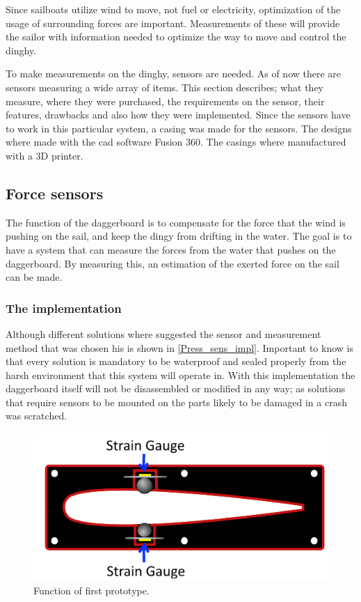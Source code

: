 
Since sailboats utilize wind to move, not fuel or electricity, optimization of the usage of surrounding forces are important. Measurements of these will provide the sailor with information needed to optimize the way to move and control the dinghy.

To make measurements on the dinghy, sensors are needed. As of now there are sensors measuring a wide array of items. This section describes; what they measure, where they were purchased, the requirements on the sensor, their features, drawbacks and also how they were implemented.
Since the sensors have to work in this particular system, a casing was made for the sensors.
The designs where made with the \gls{cad} software Fusion 360\cite{cad}. The casings where manufactured with a 3D printer.

\subsection{Force sensors}
The function of the daggerboard is to compensate for the force that the wind is pushing on the sail, and keep the dingy from drifting in the water. The goal is to have a system that can measure the forces from the water that pushes on the daggerboard. By measuring this, an estimation of the exerted force on the sail can be made. 


\subsubsection{The implementation}
Although different solutions where suggested the sensor and measurement method that was chosen his is shown in \autoref{Press_sens_impl}. 
Important to know is that every solution is mandatory to be waterproof and sealed properly from the harsh environment that this system will operate in. 
With this implementation the daggerboard itself will not be disassembled or modified in any way; as solutions that require sensors to be mounted on the parts likely to be damaged in a crash was scratched.

\begin{figure}[H]
\begin{center}
	\includegraphics[width = .7\textwidth]{Figures/Prototyp_1.png}
	\caption{Function of first prototype.}
	\label{Press_sens_impl}
\end{center}
\end{figure}



